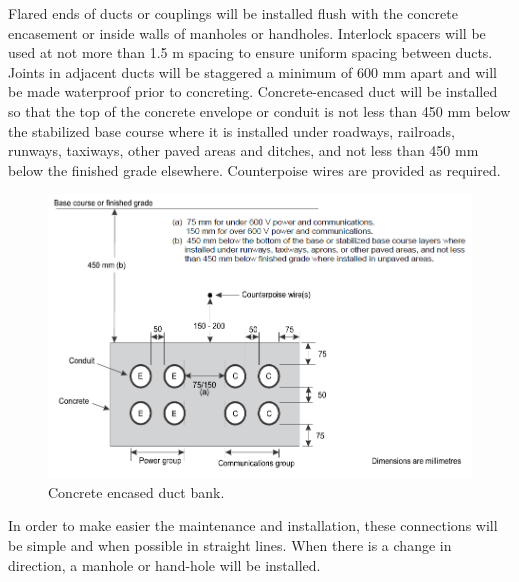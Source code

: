 	Flared ends of ducts or couplings will be installed flush with the concrete encasement or inside walls of manholes or handholes. Interlock spacers will be used at not more than 1.5 m spacing to ensure uniform spacing between ducts. Joints in adjacent ducts will be staggered a minimum of 600 mm apart and will be made waterproof prior to concreting. Concrete-encased duct will be installed so that the top of the concrete envelope or conduit is not less than 450 mm below the stabilized base course where it is installed under roadways, railroads, runways, taxiways, other paved areas and ditches, and not less than 450 mm below the finished grade elsewhere. Counterpoise wires are provided as required.
	
	\begin{figure}[H]
		\centering
		\includegraphics[clip, trim=0cm 0cm 0cm 0cm, width=\textwidth]{./images/electric/concrete}
		\caption{Concrete encased duct bank.}
		\label{concrete}
	\end{figure}
	
	In order to make easier the maintenance and installation, these connections will be simple and when possible in straight lines. When there is a change in direction, a manhole or hand-hole will be installed.
	
	
